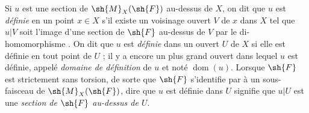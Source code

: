 \begin{env}[20.1.7]
Si $u$ est une section de $\sh{M}_X(\sh{F})$ au-dessus de $X$, on dit que $u$ est \emph{définie} en un point $x\in X$ s'il existe un voisinage ouvert $V$ de $x$ dans $X$ tel que $u|V$ soit l'image d'une section de $\sh{F}$ au-dessus de $V$ par le di-homomorphisme .
On dit que $u$ est \emph{définie} dans un ouvert $U$ de $X$ si elle est définie en tout point de $U$ ; il y a encore un plus grand ouvert dans lequel $u$ est définie, appelé \emph{domaine de définition} de $u$ et noté $\operatorname{dom}(u)$.
Lorsque $\sh{F}$ est strictement sans torsion, de sorte que $\sh{F}$ s'identifie par  à un sous-faisceau de $\sh{M}_X(\sh{F})$, dire que $u$ est définie dans $U$ signifie que $u|U$ est une \emph{section de $\sh{F}$ au-dessus de $U$}.
\end{env}

